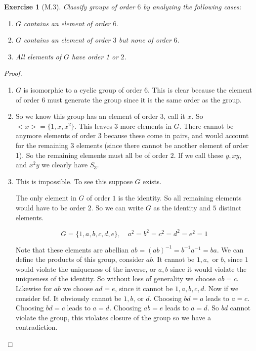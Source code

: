 \documentclass[12pt]{article}
\newtheorem*{exer}{Exercise}
\begin{document}

\begin{exer}[M.3]
Classify groups of order $6$ by analyzing the following cases:
\begin{enumerate}
\item $G$ contains an element of order $6$.
\item $G$ contains an element of order $3$ but none of order $6$.
\item All elements of $G$ have order 1 or $2$.
\end{enumerate}
\end{exer}

\begin{proof}
    \begin{enumerate}

        \item $G$ is isomorphic to a cyclic group of order $6$. This is
            clear because the element of order $6$ must generate the
            group since it is the same order as the group.

        \item So we know this group has an element of order $3$, call it
            $x$. So $<x> = \{1, x, x^2\}$. This leaves $3$ more elements
            in $G$. There cannot be anymore elements of order $3$
            because these come in pairs, and would account for the
            remaining $3$ elements (since there cannot be another
            element of order 1). So the remaining elements must all be
            of order $2$. If we call these $y, xy$, and $x^2y$ we
            clearly have $S_3$.

        \item This is impossible. To see this suppose $G$ exists.

            The only element in $G$ of order $1$ is the identity. So all
            remaining elements would have to be order $2$. So we can
            write $G$ as the identity and $5$ distinct elements.  
            
            \[ 
                G = \{1, a, b, c, d, e\}, \quad a^2 = b^2 = c^2 = d^2 =
                e^2 = 1
            \]

            Note that these elements are abellian $ab = (ab)^{-1} =
            b^{-1}a^{-1} = ba$.  We can define the products of this
            group, consider $ab$. It cannot be $1, a,$ or $b$, since $1$
            would violate the uniqueness of the inverse, or $a, b$ since
            it would violate the uniqueness of the identity. So without
            loss of generality we choose $ab = c$. Likewise for $ab$ we
            choose $ad = e$, since it cannot be $1, a, b, c, d$. Now if
            we consider $bd$. It obviously cannot be $1, b$, or $d$.
            Choosing $bd = a$ leads to $a = c$. Choosing $bd = c$ leads
            to $a = d$. Choosing $ab = e$ leads to $a = d$. So $bd$
            cannot violate the group, this violates closure of the group
            so we have a contradiction. 

    \end{enumerate}

\end{proof}
\end{document}
